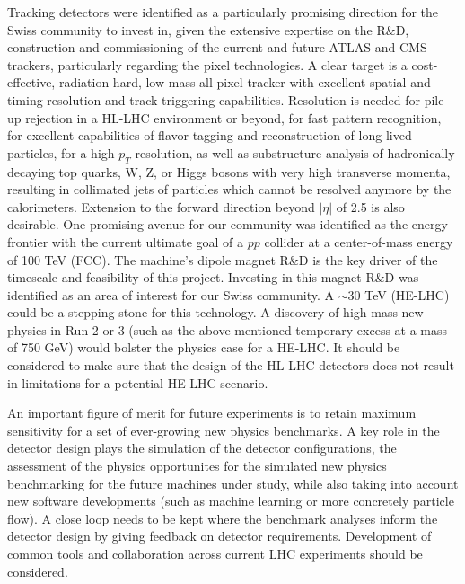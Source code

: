 \noindent Tracking detectors were identified as a particularly promising direction for the Swiss community to invest in, given the extensive expertise on the R\&D, construction and commissioning of the current and future ATLAS and CMS trackers, particularly regarding the pixel technologies.  A clear target is a cost-effective, radiation-hard, low-mass all-pixel tracker with excellent spatial and timing resolution and track triggering capabilities.  Resolution is needed for pile-up rejection in a HL-LHC environment or beyond, for fast pattern recognition, for excellent capabilities of flavor-tagging and reconstruction of long-lived particles, for a high $p_T$ resolution, as well as substructure analysis of hadronically decaying top quarks, W, Z, or Higgs bosons with very high transverse momenta, resulting in collimated jets of particles which cannot be resolved anymore by the calorimeters.  Extension to the forward direction beyond $|\eta |$ of 2.5 is also desirable. One promising avenue for our community was identified as the energy frontier with the current ultimate goal of a $pp$ collider at a center-of-mass energy of 100 TeV (FCC).  The machine's dipole magnet R\&D is the key driver of the timescale and feasibility of this project.  Investing in this magnet R\&D was identified as an area of interest for our Swiss community.  A $\sim30$ TeV (HE-LHC) could be a stepping stone for this technology.  A discovery of high-mass new physics in Run 2 or 3 (such as the above-mentioned temporary excess at a mass of 750 GeV) would bolster the physics case for a HE-LHC. It should be considered to make sure that the design of the HL-LHC detectors does not result in limitations for a potential HE-LHC scenario.
\medskip

\noindent An important figure of merit for future experiments is to retain maximum sensitivity for a set of ever-growing new physics benchmarks.  A key role in the detector design plays the simulation of the detector configurations, the assessment of the physics opportunites for the simulated new physics benchmarking for the future machines under study, while also taking into account new software developments (such as machine learning or more concretely particle flow).  A close loop needs to be kept where the benchmark analyses inform the detector design by giving feedback on detector requirements.  Development of common tools and collaboration across current LHC experiments should be considered.
